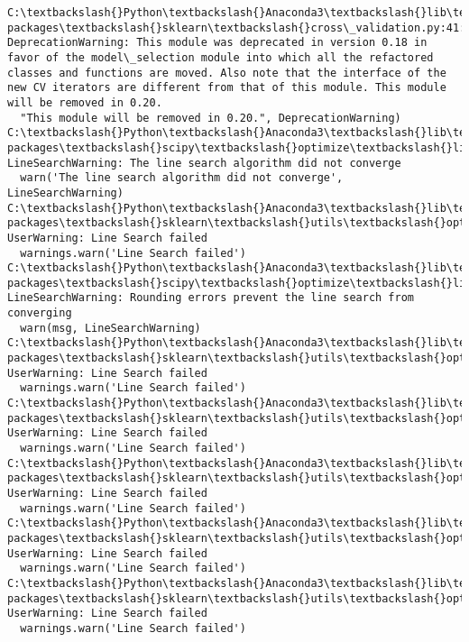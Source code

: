 \documentclass[11pt]{article}
\begin{document}
    \begin{Verbatim}[commandchars=\\\{\}]
C:\textbackslash{}Python\textbackslash{}Anaconda3\textbackslash{}lib\textbackslash{}site-packages\textbackslash{}sklearn\textbackslash{}cross\_validation.py:41: DeprecationWarning: This module was deprecated in version 0.18 in favor of the model\_selection module into which all the refactored classes and functions are moved. Also note that the interface of the new CV iterators are different from that of this module. This module will be removed in 0.20.
  "This module will be removed in 0.20.", DeprecationWarning)
C:\textbackslash{}Python\textbackslash{}Anaconda3\textbackslash{}lib\textbackslash{}site-packages\textbackslash{}scipy\textbackslash{}optimize\textbackslash{}linesearch.py:313: LineSearchWarning: The line search algorithm did not converge
  warn('The line search algorithm did not converge', LineSearchWarning)
C:\textbackslash{}Python\textbackslash{}Anaconda3\textbackslash{}lib\textbackslash{}site-packages\textbackslash{}sklearn\textbackslash{}utils\textbackslash{}optimize.py:195: UserWarning: Line Search failed
  warnings.warn('Line Search failed')
C:\textbackslash{}Python\textbackslash{}Anaconda3\textbackslash{}lib\textbackslash{}site-packages\textbackslash{}scipy\textbackslash{}optimize\textbackslash{}linesearch.py:422: LineSearchWarning: Rounding errors prevent the line search from converging
  warn(msg, LineSearchWarning)
C:\textbackslash{}Python\textbackslash{}Anaconda3\textbackslash{}lib\textbackslash{}site-packages\textbackslash{}sklearn\textbackslash{}utils\textbackslash{}optimize.py:195: UserWarning: Line Search failed
  warnings.warn('Line Search failed')
C:\textbackslash{}Python\textbackslash{}Anaconda3\textbackslash{}lib\textbackslash{}site-packages\textbackslash{}sklearn\textbackslash{}utils\textbackslash{}optimize.py:195: UserWarning: Line Search failed
  warnings.warn('Line Search failed')
C:\textbackslash{}Python\textbackslash{}Anaconda3\textbackslash{}lib\textbackslash{}site-packages\textbackslash{}sklearn\textbackslash{}utils\textbackslash{}optimize.py:195: UserWarning: Line Search failed
  warnings.warn('Line Search failed')
C:\textbackslash{}Python\textbackslash{}Anaconda3\textbackslash{}lib\textbackslash{}site-packages\textbackslash{}sklearn\textbackslash{}utils\textbackslash{}optimize.py:195: UserWarning: Line Search failed
  warnings.warn('Line Search failed')
C:\textbackslash{}Python\textbackslash{}Anaconda3\textbackslash{}lib\textbackslash{}site-packages\textbackslash{}sklearn\textbackslash{}utils\textbackslash{}optimize.py:195: UserWarning: Line Search failed
  warnings.warn('Line Search failed')

    \end{Verbatim}
\end{document}
